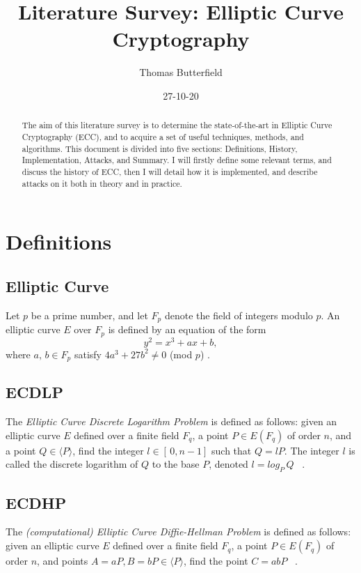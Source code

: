 \documentclass[11pt]{article}
\title{Literature Survey: Elliptic Curve Cryptography}
\date{27-10-20}
\author{Thomas Butterfield}
\begin{document}
\maketitle
{}

\begin{abstract}
    The aim of this literature survey is to determine the state-of-the-art in Elliptic Curve Cryptography (ECC), 
    and to acquire a set of useful techniques, methods, and algorithms.
    This document is divided into five sections: Definitions, History, Implementation, Attacks, and Summary.
    I will firstly define some relevant terms, and discuss the history of ECC, then I will detail how it is implemented, 
    and describe attacks on it both in theory and in practice.
\end{abstract}

\section{Definitions}

\subsection{Elliptic Curve} \label{Elliptic Curve}
Let $p$ be a prime number, and let $F_p$ denote the field of integers modulo $p$. 
An elliptic curve $E$ over $F_p$ is defined by an equation of the form
\begin{equation*}
y^2 = x^3 + ax + b,
\end{equation*}
where $a,\, b \in F_p$ satisfy $4a^3 + 27b^2 \ne 0$ (mod $ p$) \cite{hankerson2003guide,lopez2000overview}.

\subsection{ECDLP} \label{ECDLP}
The \emph{Elliptic Curve Discrete Logarithm Problem} is defined as follows: 
given an elliptic curve $E$ defined over a finite field $F_q$, 
a point $P \in E(F_q)$ of order $n$, and a point $Q \in \langle P \rangle$, 
find the integer $l \in [\,0,n-1]$ such that $Q = lP$. The integer $l$ is called the discrete logarithm of $Q$ to the base $P$, 
denoted $l = log_P \, Q$ ~\cite{hankerson2003guide}.

\subsection{ECDHP} \label{ECDHP}
The \emph{(computational) Elliptic Curve Diffie-Hellman Problem} is defined as follows: 
given an elliptic curve $E$ defined over a finite field $F_q$, 
a point $P \in E(F_q)$ of order $n$, and points $A = aP, B = bP \in \langle P \rangle$, 
find the point $C = abP$ ~\cite{hankerson2003guide}.
\end{document}
